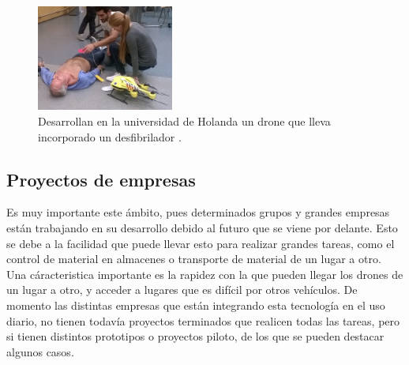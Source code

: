 \begin{figure}[H]
	\centering
		\includegraphics[width=0.4\textwidth]{imgs/drone_desfibrilador.jpg}
		\caption{Desarrollan en la universidad de Holanda un drone que lleva incorporado un desfibrilador .}
	\label{fig: Drone con desfibrilador para emergencias.}
\end{figure} 



\subsection{Proyectos de empresas }
\hspace{1 cm} Es muy importante este \'ambito, pues determinados grupos y grandes empresas est\'an trabajando en su desarrollo debido al futuro que se viene por delante. Esto se debe a la facilidad que puede llevar esto para realizar grandes tareas, como el control de material en almacenes o transporte de material de un lugar a otro. Una c\'aracteristica importante es la rapidez con la que pueden llegar los drones de un lugar a otro, y acceder a lugares que es dif\'icil por otros veh\'iculos. De momento las distintas empresas que est\'an integrando esta tecnolog\'ia en el uso diario, no tienen todav\'ia proyectos terminados que realicen todas las tareas, pero si tienen distintos prototipos o proyectos piloto, de los que se pueden destacar algunos casos.


